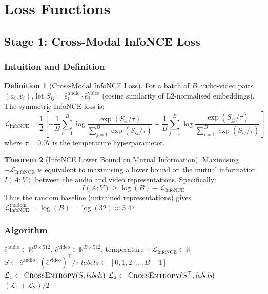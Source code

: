 \documentclass[12pt,a4paper]{article}
\theoremstyle{definition}
\newtheorem{theorem}{Theorem}[section]
\newtheorem{definition}[theorem]{Definition}
\theoremstyle{remark}
\begin{document}
\section{Loss Functions}

\subsection{Stage 1: Cross-Modal InfoNCE Loss}

\subsubsection{Intuition and Definition}

\begin{definition}[Cross-Modal InfoNCE Loss]
For a batch of $B$ audio-video pairs $(a_i, v_i)$, let
$S_{ij} = \hat{e}_i^{\text{audio}} \cdot \hat{e}_j^{\text{video}}$
(cosine similarity of L2-normalised embeddings). The symmetric
InfoNCE loss is:
\[
  \mathcal{L}_{\text{InfoNCE}} = \frac{1}{2}
  \left[
    -\frac{1}{B}\sum_{i=1}^{B}\log\frac{\exp(S_{ii}/\tau)}{\sum_{j=1}^{B}\exp(S_{ij}/\tau)}
    -\frac{1}{B}\sum_{j=1}^{B}\log\frac{\exp(S_{jj}/\tau)}{\sum_{i=1}^{B}\exp(S_{ij}/\tau)}
  \right]
\]
where $\tau = 0.07$ is the temperature hyperparameter.
\end{definition}

\begin{theorem}[InfoNCE Lower Bound on Mutual Information]
Maximising $-\mathcal{L}_{\text{InfoNCE}}$ is equivalent to maximising
a lower bound on the mutual information $I(A; V)$ between the audio and
video representations. Specifically:
\[
  I(A; V) \geq \log(B) - \mathcal{L}_{\text{InfoNCE}}
\]
Thus the random baseline (untrained representations) gives
$\mathcal{L}_{\text{InfoNCE}}^{\text{random}} = \log(B) = \log(32) \approx 3.47$.
\end{theorem}

\subsubsection{Algorithm}

\begin{algorithm}[H]
\caption{Cross-Modal InfoNCE Loss}
\label{alg:infonce}
\begin{algorithmic}[1]
\Require $\hat{e}^{\text{audio}} \in \mathbb{R}^{B \times 512}$,
         $\hat{e}^{\text{video}} \in \mathbb{R}^{B \times 512}$, temperature $\tau$
\Ensure $\mathcal{L}_{\text{InfoNCE}} \in \mathbb{R}$
\State $S \gets \hat{e}^{\text{audio}} \cdot (\hat{e}^{\text{video}})^\top / \tau$
\State $\textit{labels} \gets [0, 1, 2, \ldots, B-1]$
\State $\mathcal{L}_1 \gets \textsc{CrossEntropy}(S, \textit{labels})$
\State $\mathcal{L}_2 \gets \textsc{CrossEntropy}(S^\top, \textit{labels})$
\State \Return $(\mathcal{L}_1 + \mathcal{L}_2) / 2$
\end{algorithmic}
\end{algorithm}
\end{document}
